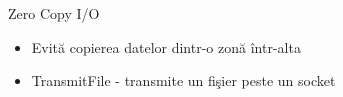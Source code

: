 \documentclass{so.cs.pub.ro}
\begin{document}
\begin{frame}{Zero Copy I/O}
  \begin{itemize}    %
    \item Evită copierea datelor dintr-o zonă într-alta
    \item TransmitFile - transmite un fişier peste un socket
  \end{itemize}
\begin{columns}
  \begin{column}[1]{0.5\textwidth}
  \end{column}
  \begin{column}[1]{0.5\textwidth}
  \end{column}
\end{columns}
\end{frame}

\end{document}
